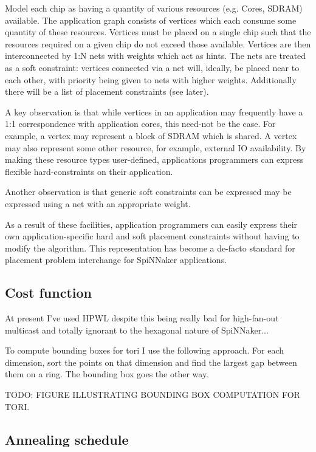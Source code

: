 			Model each chip as having a quantity of various resources (e.g. Cores,
			SDRAM) available. The application graph consists of vertices which each
			consume some quantity of these resources. Vertices must be placed on a
			single chip such that the resources required on a given chip do not
			exceed those available. Vertices are then interconnected by 1:N nets with
			weights which act as hints. The nets are treated as a soft constraint:
			vertices connected via a net will, ideally, be placed near to each other,
			with priority being given to nets with higher weights. Additionally there
			will be a list of placement constraints (see later).
			
			A key observation is that while vertices in an application may frequently
			have a 1:1 correspondence with application cores, this need-not be the
			case. For example, a vertex may represent a block of SDRAM which is
			shared. A vertex may also represent some other resource, for example,
			external IO availability. By making these resource types user-defined,
			applications programmers can express flexible hard-constraints on their
			application.
			
			Another observation is that generic soft constraints can be expressed may
			be expressed using a net with an appropriate weight.
			
			As a result of these facilities, application programmers can easily
			express their own application-specific hard and soft placement
			constraints without having to modify the algorithm. This representation
			has become a de-facto standard for placement problem interchange for
			SpiNNaker applications.
		
		\subsection{Cost function}
			
			At present I've used HPWL despite this being really bad for high-fan-out
			multicast and totally ignorant to the hexagonal nature of SpiNNaker...
			
			To compute bounding boxes for tori I use the following approach. For each
			dimension, sort the points on that dimension and find the largest gap
			between them on a ring. The bounding box goes the other way.
			
			TODO: FIGURE ILLUSTRATING BOUNDING BOX COMPUTATION FOR TORI.
		
		\subsection{Annealing schedule}
			
